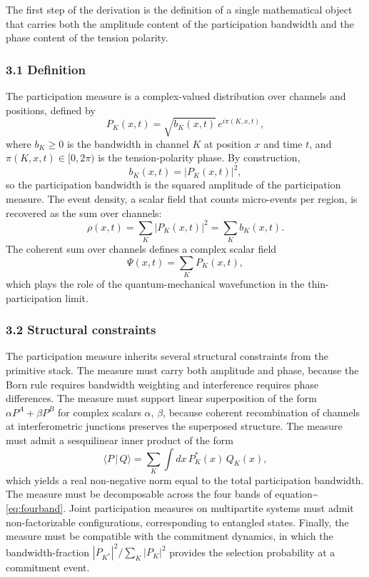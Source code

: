 \documentclass[
  11pt,
]{article}
\begin{document}
The first step of the derivation is the definition of a single
mathematical object that carries both the amplitude content of the
participation bandwidth and the phase content of the tension polarity.

\subsubsection{3.1 Definition}\label{definition}

The participation measure is a complex-valued distribution over channels
and positions, defined by \begin{equation}
  P_K(x,t) = \sqrt{b_K(x,t)} \, e^{i \pi(K,x,t)},
  \label{eq:P_def}
\end{equation} where \(b_K \geq 0\) is the bandwidth in channel \(K\) at
position \(x\) and time \(t\), and \(\pi(K,x,t) \in [0, 2\pi)\) is the
tension-polarity phase. By construction, \begin{equation}
  b_K(x,t) = |P_K(x,t)|^2,
  \label{eq:b_is_Psquared}
\end{equation} so the participation bandwidth is the squared amplitude
of the participation measure. The event density, a scalar field that
counts micro-events per region, is recovered as the sum over channels:
\begin{equation}
  \rho(x,t) = \sum_K |P_K(x,t)|^2 = \sum_K b_K(x,t).
\end{equation} The coherent sum over channels defines a complex scalar
field \begin{equation}
  \Psi(x,t) = \sum_K P_K(x,t),
\end{equation} which plays the role of the quantum-mechanical
wavefunction in the thin-participation limit.

\subsubsection{3.2 Structural constraints}\label{structural-constraints}

The participation measure inherits several structural constraints from
the primitive stack. The measure must carry both amplitude and phase,
because the Born rule requires bandwidth weighting and interference
requires phase differences. The measure must support linear
superposition of the form \(\alpha P^A + \beta P^B\) for complex scalars
\(\alpha\), \(\beta\), because coherent recombination of channels at
interferometric junctions preserves the superposed structure. The
measure must admit a sesquilinear inner product of the form
\begin{equation}
  \langle P \, | \, Q \rangle = \sum_K \int dx \, P_K^*(x) \, Q_K(x),
  \label{eq:inner}
\end{equation} which yields a real non-negative norm equal to the total
participation bandwidth. The measure must be decomposable across the
four bands of equation\textasciitilde{}\eqref{eq:fourband}. Joint
participation measures on multipartite systems must admit
non-factorizable configurations, corresponding to entangled states.
Finally, the measure must be compatible with the commitment dynamics, in
which the bandwidth-fraction \(|P_{K^*}|^2 / \sum_K |P_K|^2\) provides
the selection probability at a commitment event.
\end{document}
